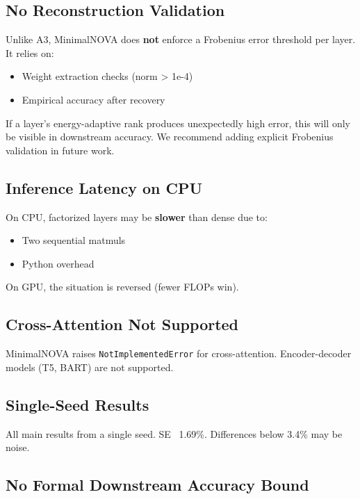 \subsection{No Reconstruction Validation}

Unlike A3, MinimalNOVA does \textbf{not} enforce a Frobenius error threshold 
per layer. It relies on:
\begin{itemize}
\item Weight extraction checks (norm \textgreater{} 1e-4)
\item Empirical accuracy after recovery

\end{itemize}
If a layer's energy-adaptive rank produces unexpectedly high error, this 
will only be visible in downstream accuracy. We recommend adding explicit 
Frobenius validation in future work.

\subsection{Inference Latency on CPU}

On CPU, factorized layers may be \textbf{slower} than dense due to:
\begin{itemize}
\item Two sequential matmuls
\item Python overhead

\end{itemize}
On GPU, the situation is reversed (fewer FLOPs win).

\subsection{Cross-Attention Not Supported}

MinimalNOVA raises \texttt{NotImplementedError} for cross-attention. Encoder-decoder 
models (T5, BART) are not supported.

\subsection{Single-Seed Results}

All main results from a single seed. SE ~1.69\%. Differences below 3.4\% may 
be noise.

\subsection{No Formal Downstream Accuracy Bound}

